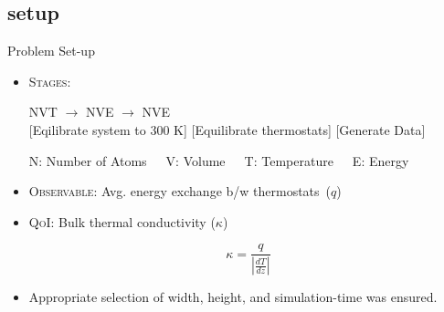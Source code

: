 \documentclass[xcolor={x11names,table},compress,svgnames,mathserif]{beamer}
\renewcommand{\(}{\begin{columns}}
\renewcommand{\)}{\end{columns}}
\newcommand{\<}[1]{\begin{column}{#1}}
\renewcommand{\>}{\end{column}}
\newcommand*\myitem{%
  \item[\color{DeepSkyBlue4}\scalebox{0.6}{\ding{110}}]}
\newcommand{\be}{\begin{equation}}
\newcommand{\ee}{\end{equation}}
\begin{document}
\subsection{setup}
\begin{frame}{Problem Set-up}


\begin{itemize}
\myitem \textsc{Stages}:\\

\begin{center}
{\color{green}NVT} \hspace{5mm} $\rightarrow$ \hspace{5mm} {\color{cyan}NVE} \hspace{5mm}
$\rightarrow$ \hspace{5mm} {\color{magenta}NVE}
\\ \vspace{1mm}
\tiny \hspace{-5mm}[Eqilibrate system to 300 K] \hspace{1mm} [Equilibrate thermostats] \hspace{4mm}
 [Generate Data]
\\ \vspace{1mm}

\tiny{N: Number of Atoms~~~V: Volume~~~T: Temperature~~~E: Energy}
\end{center}

\normalsize

\myitem \textsc{Observable}: Avg. energy exchange b/w thermostats~($q$)
\vspace{2mm}

\myitem \textsc{QoI}: Bulk thermal conductivity ($\kappa$)

\begin{center}
\begin{tcolorbox}[width=0.3\textwidth,height=0.2\textwidth,colback=DeepSkyBlue!20,notitle,colframe=DeepSkyBlue!20,colupper=DeepSkyBlue4]
\vspace{-2mm}
\be
\kappa = \frac{q}{\left|\frac{dT}{dz}\right|} \nonumber
\ee
\end{tcolorbox}
\end{center}


\vspace{2mm}

\myitem Appropriate selection of {\color{pigment}width}, 
{\color{pigment}height}, and {\color{pigment}simulation-time} was ensured.  
\end{itemize}

\end{frame}
\end{document}
